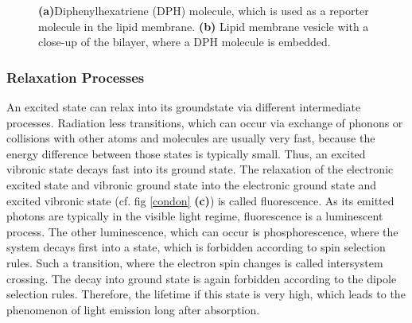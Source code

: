 \documentclass{scrartcl}
\numberwithin{equation}{section}
\numberwithin{figure}{section}
\numberwithin{table}{section}
\begin{document}
\begin{figure}
\centering
{}
\caption{ \small \textbf{(a)}Diphenylhexatriene (DPH) molecule, which is used as a reporter molecule in the lipid membrane. \textbf{(b)} Lipid membrane vesicle with a close-up of the bilayer, where a DPH molecule is embedded.}
\label{dph}
\end{figure}

\subsubsection{Relaxation Processes}
An excited state can relax into its groundstate via different intermediate processes. Radiation less transitions, which can occur via exchange of phonons or collisions with other atoms and molecules are usually very fast, because the energy difference between those states is typically small. Thus, an excited vibronic state decays fast into its ground state. The relaxation of the electronic excited state and vibronic ground state into the electronic ground state and excited vibronic state (cf. fig \ref{condon} \textbf{(c)}) is called fluorescence. As its emitted photons are typically in the visible light regime, fluorescence is a luminescent process. The other luminescence, which can occur is phosphorescence, where the system decays first into a state, which is forbidden according to spin selection rules. Such a transition, where the electron spin changes is called intersystem crossing. The decay into ground state is again forbidden according to the dipole selection rules. Therefore, the lifetime if this state is very high, which leads to the phenomenon of light emission long after absorption.
\end{document}

